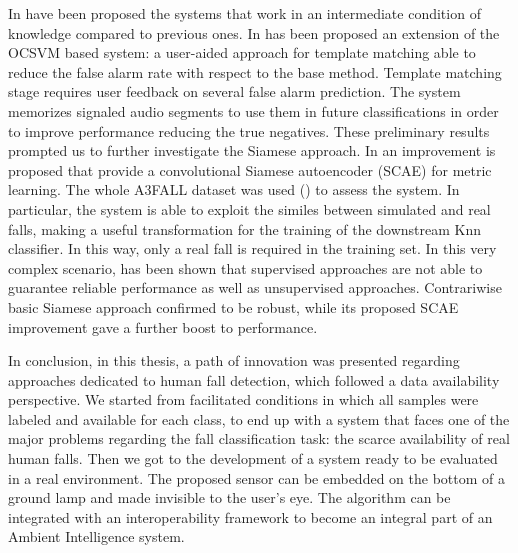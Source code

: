 In  have been proposed the systems that work in an intermediate condition of knowledge compared to previous ones. In  has been proposed an extension of the OCSVM based system: a user-aided approach for template matching able to reduce the false alarm rate with respect to the base method. Template matching stage requires user feedback on several false alarm prediction. The system memorizes signaled audio segments to use them in future classifications in order to improve performance reducing the true negatives.
These preliminary results prompted us to further investigate the Siamese approach. In  an improvement is proposed that provide a convolutional Siamese autoencoder (SCAE) for metric learning.  The whole A3FALL dataset was used ()  to assess the system. In particular,  the system is able to exploit the similes between simulated and real falls, making a useful transformation for the training of the downstream Knn classifier. In this way, only a real fall is required in the training set. In this very complex scenario, has been shown that supervised approaches are not able to guarantee reliable performance as well as unsupervised approaches. Contrariwise basic Siamese approach confirmed to be robust, while its proposed SCAE improvement gave a further boost to performance.

In conclusion, in this thesis, a path of innovation was presented regarding approaches dedicated to human fall detection, which followed a  data availability perspective. We started from facilitated conditions in which all samples were labeled and available for each class, to end up with a system that faces one of the major problems regarding the fall classification task: the scarce availability of real human falls. Then we got to the development of a system ready to be evaluated in a real environment. The proposed sensor can be embedded on the bottom of a ground lamp and made invisible to the user's eye. The algorithm can be integrated with an interoperability framework to become an integral part of an Ambient Intelligence system.

